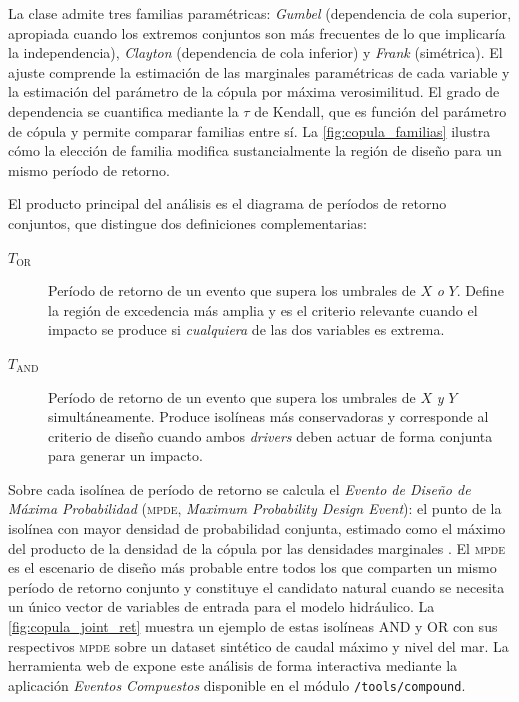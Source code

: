 La clase admite tres familias paramétricas: \emph{Gumbel} (dependencia de cola superior, apropiada cuando los extremos conjuntos son más frecuentes de lo que implicaría la independencia), \emph{Clayton} (dependencia de cola inferior) y \emph{Frank} (simétrica). El ajuste comprende la estimación de las marginales paramétricas de cada variable y la estimación del parámetro de la cópula por máxima verosimilitud. El grado de dependencia se cuantifica mediante la $\tau$ de Kendall, que es función del parámetro de cópula y permite comparar familias entre sí. La \cref{fig:copula_familias} ilustra cómo la elección de familia modifica sustancialmente la región de diseño para un mismo período de retorno.

El producto principal del análisis es el diagrama de períodos de retorno conjuntos, que distingue dos definiciones complementarias:
\begin{description}
  \item[$T_{\mathrm{OR}}$] Período de retorno de un evento que supera los umbrales de $X$ \emph{o} $Y$. Define la región de excedencia más amplia y es el criterio relevante cuando el impacto se produce si \emph{cualquiera} de las dos variables es extrema.
  \item[$T_{\mathrm{AND}}$] Período de retorno de un evento que supera los umbrales de $X$ \emph{y} $Y$ simultáneamente. Produce isolíneas más conservadoras y corresponde al criterio de diseño cuando ambos \emph{drivers} deben actuar de forma conjunta para generar un impacto.
\end{description}

Sobre cada isolínea de período de retorno se calcula el \emph{Evento de Diseño de Máxima Probabilidad} (\textsc{mpde}, \emph{Maximum Probability Design Event}): el punto de la isolínea con mayor densidad de probabilidad conjunta, estimado como el máximo del producto de la densidad de la cópula por las densidades marginales \parencite{salvadori2007extremes}. El \textsc{mpde} es el escenario de diseño más probable entre todos los que comparten un mismo período de retorno conjunto y constituye el candidato natural cuando se necesita un único vector de variables de entrada para el modelo hidráulico. La \cref{fig:copula_joint_ret} muestra un ejemplo de estas isolíneas AND y OR con sus respectivos \textsc{mpde} sobre un dataset sintético de caudal máximo y nivel del mar. La herramienta web de \hydra expone este análisis de forma interactiva mediante la aplicación \emph{Eventos Compuestos} disponible en el módulo \texttt{/tools/compound}.

